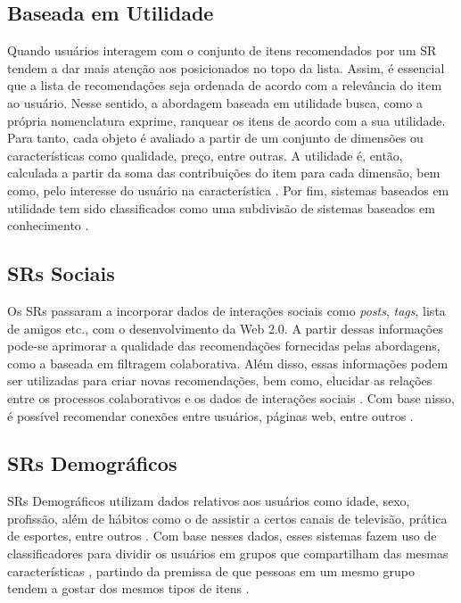     \subsection{Baseada em Utilidade}
    
    Quando usuários interagem com o conjunto de itens recomendados por um SR tendem a dar mais atenção aos posicionados no topo da lista. Assim, é essencial que a lista de recomendações seja ordenada de acordo com a relevância do item ao usuário. Nesse sentido, a abordagem baseada em utilidade busca, como a própria nomenclatura exprime, ranquear os itens de acordo com a sua utilidade. Para tanto, cada objeto é avaliado a partir de um conjunto de dimensões ou características como qualidade, preço, entre outras. A utilidade é, então, calculada a partir da soma das contribuições do item para cada dimensão, bem como, pelo interesse do usuário na característica \cite{Jannach2010}. Por fim, sistemas baseados em utilidade tem sido classificados como uma subdivisão de sistemas baseados em conhecimento \cite{Aggarwal2016}.
    
    \subsection{SRs Sociais}
    
    Os SRs passaram a incorporar dados de interações sociais como \textit{posts}, \textit{tags}, lista de amigos etc., com o desenvolvimento da Web 2.0. A partir dessas informações pode-se aprimorar a qualidade das recomendações fornecidas pelas abordagens, como a baseada em filtragem colaborativa. Além disso, essas informações podem ser utilizadas para criar novas recomendações, bem como, elucidar as relações entre os processos colaborativos e os dados de interações sociais \cite{Bobadilla_2013}. Com base nisso, é possível recomendar conexões entre usuários, páginas web, entre outros \cite{Aggarwal2016}.
    
    
    \subsection{SRs Demográficos}
    
    SRs Demográficos utilizam dados relativos aos usuários como idade, sexo, profissão, além de hábitos como o de assistir a certos canais de televisão, prática de esportes, entre outros \cite{Krulwich1997}. Com base nesses dados, esses sistemas fazem uso de classificadores para dividir os usuários em grupos que compartilham das mesmas características \cite{Aggarwal2016}, partindo da premissa de que pessoas em um mesmo grupo tendem a gostar dos mesmos tipos de itens \cite{Pazzani1999}. 
   
